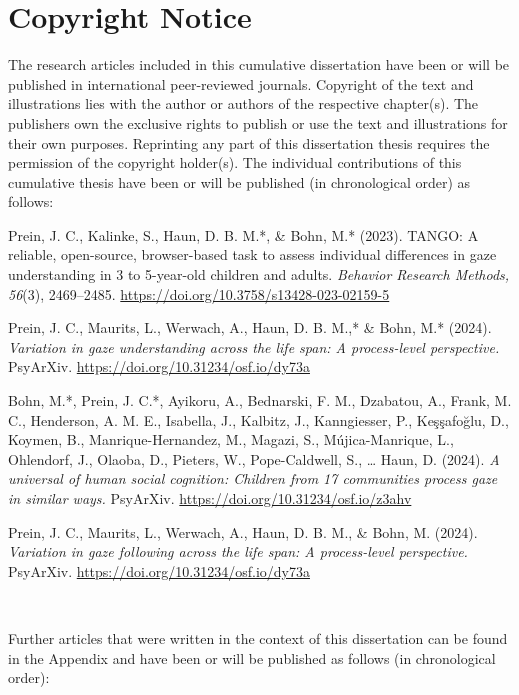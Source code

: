 \documentclass[
]{scrbook}
\begin{document}
\begin{titlepage}
\end{titlepage}

\tableofcontents

\chapter{Copyright Notice}\label{copyright}

The research articles included in this cumulative dissertation have been or will be published in international peer-reviewed journals. Copyright of the text and illustrations lies with the author or authors of the respective chapter(s). The publishers own the exclusive rights to publish or use the text and illustrations for their own purposes. Reprinting any part of this dissertation thesis requires the permission of the copyright holder(s).
The individual contributions of this cumulative thesis have been or will be published (in chronological order) as follows:

Prein, J. C., Kalinke, S., Haun, D. B. M.*, \& Bohn, M.* (2023). TANGO: A reliable, open-source, browser-based task to assess individual differences in gaze understanding in 3 to 5-year-old children and adults. \emph{Behavior Research Methods, 56}(3), 2469--2485. \url{https://doi.org/10.3758/s13428-023-02159-5}

Prein, J. C., Maurits, L., Werwach, A., Haun, D. B. M.,* \& Bohn, M.* (2024). \emph{Variation in gaze understanding across the life span: A process-level perspective.} PsyArXiv. \url{https://doi.org/10.31234/osf.io/dy73a}

Bohn, M.*, Prein, J. C.*, Ayikoru, A., Bednarski, F. M., Dzabatou, A., Frank, M. C., Henderson, A. M. E., Isabella, J., Kalbitz, J., Kanngiesser, P., Keşşafoğlu, D., Koymen, B., Manrique-Hernandez, M., Magazi, S., Mújica-Manrique, L., Ohlendorf, J., Olaoba, D., Pieters, W., Pope-Caldwell, S., \ldots{} Haun, D. (2024). \emph{A universal of human social cognition: Children from 17 communities process gaze in similar ways.} PsyArXiv. \url{https://doi.org/10.31234/osf.io/z3ahv}

Prein, J. C., Maurits, L., Werwach, A., Haun, D. B. M., \& Bohn, M. (2024). \emph{Variation in gaze following across the life span: A process-level perspective.} PsyArXiv. \url{https://doi.org/10.31234/osf.io/dy73a}

~

Further articles that were written in the context of this dissertation can be found in the Appendix and have been or will be published as follows (in chronological order):
\end{document}
